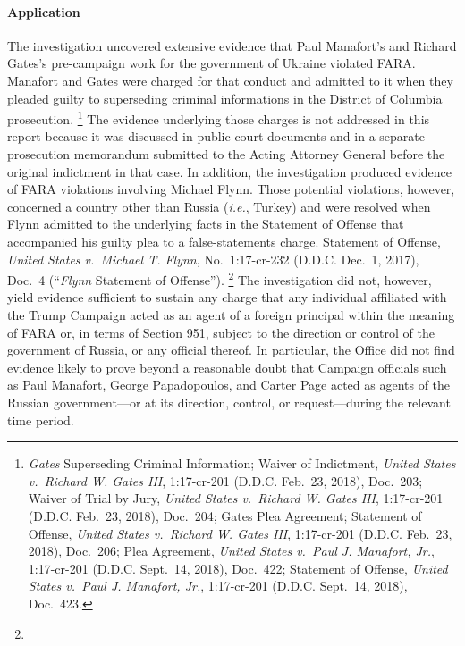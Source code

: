 \paragraph{Application}
The investigation uncovered extensive evidence that Paul Manafort's and Richard Gates's pre-campaign work for the government of Ukraine violated FARA\null.
Manafort and Gates were charged for that conduct and admitted to it when they pleaded guilty to superseding criminal informations in the District of Columbia prosecution.%
\footnote{\textit{Gates} Superseding Criminal Information;
Waiver of Indictment, \textit{United States v.\ Richard W. Gates III}, 1:17-cr-201 (D.D.C. Feb.~23, 2018), Doc.~203;
Waiver of Trial by Jury, \textit{United States v.\ Richard W. Gates III}, 1:17-cr-201 (D.D.C. Feb.~23, 2018), Doc.~204;
Gates Plea Agreement;
Statement of Offense, \textit{United States v.\ Richard W. Gates III}, 1:17-cr-201 (D.D.C. Feb.~23, 2018), Doc.~206;
Plea Agreement, \textit{United States v.\ Paul J. Manafort, Jr.}, 1:17-cr-201 (D.D.C. Sept.~14, 2018), Doc.~422;
Statement of Offense, \textit{United States v.\ Paul J. Manafort, Jr.}, 1:17-cr-201 (D.D.C. Sept.~14, 2018), Doc.~423.}
The evidence underlying those charges is not addressed in this report because it was discussed in public court documents and in a separate prosecution memorandum submitted to the Acting Attorney General before the original indictment in that case.
In addition, the investigation produced evidence of FARA violations involving Michael Flynn.
Those potential violations, however, concerned a country other than Russia (\textit{i.e.}, Turkey) and were resolved when Flynn admitted to the underlying facts in the Statement of Offense that accompanied his guilty plea to a false-statements charge.
Statement of Offense, \textit{United States v.\ Michael T. Flynn}, No.~1:17-cr-232 (D.D.C. Dec.~1, 2017), Doc.~4 (``\textit{Flynn} Statement of Offense'').%
\footnote{}
The investigation did not, however, yield evidence sufficient to sustain any charge that any individual affiliated with the Trump Campaign acted as an agent of a foreign principal within the meaning of FARA or, in terms of Section 951, subject to the direction or control of the government of Russia, or any official thereof.
In particular, the Office did not find evidence likely to prove beyond a reasonable doubt that Campaign officials such as Paul Manafort, George Papadopoulos, and Carter Page acted as agents of the Russian government---or at its direction, control, or request---during the relevant time period.%
